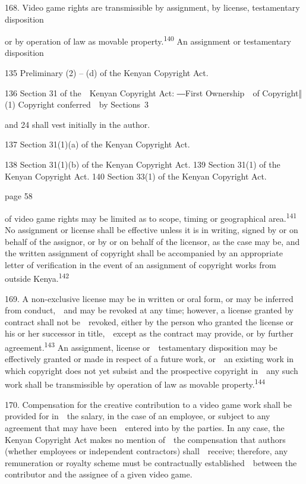\documentclass[
]{article}
\begin{document}
{168. }{Video game rights are transmissible by assignment, by license,
testamentary disposition}

{or by operation of law as movable property.}\textsuperscript{{140 }}{An
assignment or testamentary disposition}

{135 }{Preliminary (2) }{-- }{(d) of the Kenyan }{Copyright Act.}

{136 }{Section 31 of the~~Kenyan }{Copyright Act}{: }{―First
}{Ownership~~of Copyri}{ght‖ (1) Copyright conferred~~by Sections}{~3}

{and 24 shall vest initially in the author.}

{137 }{Section 31(1)(a) of the Kenyan }{Copyright Act}{.}

{138 }{Section 31(1)(b) of the Kenyan }{Copyright Act}{. }{139 }{Section
31(1) of the Kenyan }{Copyright Act}{. }{140 }{Section 33(1) of the
Kenyan }{Copyright Act}{.}

{page 58}

{of video game rights may be limited as to scope, timing or geographical
area.}\textsuperscript{{141 }}{No assignment or license shall be
effective unless it is in writing, signed by or on behalf of the
assignor, or by or on behalf of the licensor, as the case may be, and
the written assignment of copyright shall be accompanied by an
appropriate letter of verification in the event of an assignment of
copyright works from outside Kenya.}\textsuperscript{{142}}

{169. }{A non-exclusive license may be in written or oral form, or may
be inferred from conduct,~~and may be revoked at any time; however, a
license granted by contract shall not be~~revoked, either by the person
who granted the license or his or her successor in title,~~except as the
contract may provide, or by further agreement.}\textsuperscript{{143
}}{An assignment, license or~~testamentary disposition may be
effectively granted or made in respect of a future work, or~~an existing
work in which copyright does not yet subsist and the prospective
copyright in~~any such work shall be transmissible by operation of law
as movable property.}\textsuperscript{{144}}

{170. }{Compensation for the creative contribution to a video game work
shall be provided for in~~the salary, in the case of an employee, or
subject to any agreement that may have been~~entered into by the
parties. In any case, the Kenyan }{Copyright Act }{makes no mention
of~~the compensation that authors (whether employees or independent
contractors) shall~~receive; therefore, any remuneration or royalty
scheme must be contractually established~~between the contributor and
the assignee of a given video game.}
\end{document}
